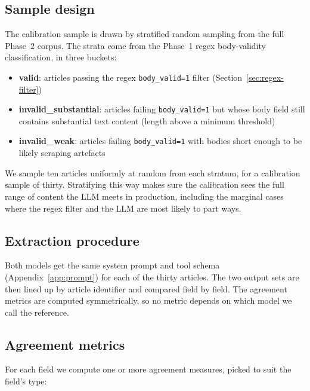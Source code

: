 \subsection{Sample design}\label{sec:calibration-sample}

The calibration sample is drawn by stratified random sampling from the full Phase~2 corpus. The strata come from the Phase~1 regex body-validity classification, in three buckets:

\begin{itemize}
  \item \textbf{valid}: articles passing the regex \texttt{body\_valid=1} filter (Section~\ref{sec:regex-filter})
  \item \textbf{invalid\_substantial}: articles failing \texttt{body\_valid=1} but whose body field still contains substantial text content (length above a minimum threshold)
  \item \textbf{invalid\_weak}: articles failing \texttt{body\_valid=1} with bodies short enough to be likely scraping artefacts
\end{itemize}

We sample ten articles uniformly at random from each stratum, for a calibration sample of thirty. Stratifying this way makes sure the calibration sees the full range of content the LLM meets in production, including the marginal cases where the regex filter and the LLM are most likely to part ways.

\subsection{Extraction procedure}\label{sec:calibration-procedure}

Both models get the same system prompt and tool schema (Appendix~\ref{app:prompt}) for each of the thirty articles. The two output sets are then lined up by article identifier and compared field by field. The agreement metrics are computed symmetrically, so no metric depends on which model we call the reference.

\subsection{Agreement metrics}\label{sec:calibration-metrics}

For each field we compute one or more agreement measures, picked to suit the field's type:

